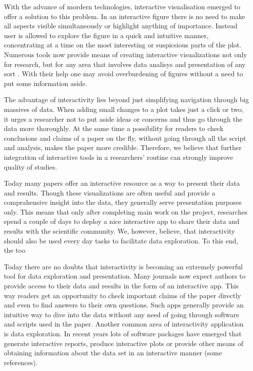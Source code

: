 \documentclass[twocolumn,10pt]{article}
\begin{document}
With the advance of mordern technologies, interactive visualisation emerged to offer a solution to this problem. In an interactive figure there is no need to make all aspects visible simultaneously or highlight anything of importance. Instead user is allowed to explore the figure in a quick and intuitive manner, concentrating at a time on the most interesting or suspicsious parts of the plot. Numerous tools now provide means of creating interactive visualizations not only for research, but for any area that involves data analisys and presentation of any sort \citep{caldarola_2017}. With their help one may avoid overburdening of figures without a need to put some information aside.

The advantage of interactivity lies beyond just simplifying navigation through big massives of data. When adding small changes to a plot takes just a click or two, it urges a researcher not to put aside ideas or concerns and thus go through the data more thoroughly. At the same time a possibility for readers to check conclusions and claims of a paper on the fly, without going through all the script and analysis, makes the paper more credible. Therefore, we believe that further integration of interactive tools in a researchers' routine can strongly improve quality of studies.

Today many papers offer an interactive resource as a way to present their data and results. Though these visualizations are often useful and provide a comprahensive insight into the data, they generally serve presentation purposes only. This means that only after completing main work on the project, researches spend a couple of days to deploy a nice interactive app to share their data and results with the scientific community. We, however, believe, that interactivity should also be used every day tasks to facilitate data exploration. To this end, the too


Today there are no doubts that interactivity is becoming an extremely powerful tool for data exploration and presentation. Many journals now expect authors to provide access to their data and results in the form of an interactive app. This way readers get an opportunity to check important claims of the paper directly and even to find answers to their own questions. Such apps generally provide an intuitive way to dive into the data without any need of going through software and scripts used in the paper. Another common area of interactivity application is data exploration. In recent years lots of software packages have emerged that generate interactive reports, produce interactive plots or provide other means of obtaining information about the data set in an interactive manner (some references).
\end{document}
